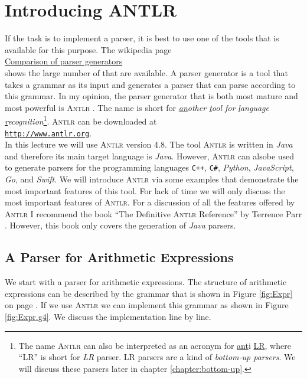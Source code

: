 \chapter{Introducing ANTLR}
If the task is to implement a parser, it is best to use one of the tools that is available for this purpose.
The wikipedia page 
\\[0.2cm]
\hspace*{1.3cm}
\href{https://en.wikipedia.org/wiki/Comparison_of_parser_generators}{Comparison of parser generators}
\\[0.2cm]
shows the large number of  that are available.  
A parser generator  is a tool that takes a grammar as its input and generates a parser
that can parse according to this grammar.
In my opinion, the parser generator that is both most mature and most powerful is
\textsc{Antlr}  \cite{parr:2012,parr:2014}.  The name is short for 
\emph{\underline{an}other \underline{t}ool for \underline{l}anguage \underline{r}ecognition}\footnote{
  The name \textsc{Antlr} can also be interpreted as an acronym for \underline{ant}i \underline{LR},
  where ``LR'' is short for \emph{LR} parser.  LR parsers are a kind of \emph{bottom-up parsers}.  We will discuss these
  parsers later in chapter \ref{chapter:bottom-up}.
}.
\textsc{Antlr} can be downloaded at 
\\[0.2cm]
\hspace*{1.3cm}
\href{http://www.antlr.org}{\texttt{http://www.antlr.org}}.
\\[0.2cm]
In this lecture we will use \textsc{Antlr} version 4.8.  The tool \textsc{Antlr} is written in \textsl{Java}
and therefore its main target language is \textsl{Java}.  However, \textsc{Antlr} can alsobe used to generate
parsers for the programming languages \texttt{C++}, \texttt{C\#}, \textsl{Python}, \textsl{JavaScript},
\textsl{Go}, and \textsl{Swift}. 
We will introduce \textsc{Antlr} via some examples that demonstrate the most important features of this tool.
For lack of time we will only discuss the most important features of \textsc{Antlr}.  For a discussion of all
the features offered by \textsc{Antlr} I recommend the book ``The Definitive \textsc{Antlr} Reference'' by
Terrence Parr \cite{parr:2012}.  However, this book only covers the generation of \textsl{Java} parsers.

\section{A Parser for Arithmetic Expressions}
We start with a parser for arithmetic expressions.  The structure of arithmetic expressions can be described by
the grammar that is shown in Figure \ref{fig:Expr} on page \pageref{fig:Expr}.
If we use \textsc{Antlr} we can implement this grammar as shown in Figure \ref{fig:Expr.g4}.  
We discuss the implementation line by line.

